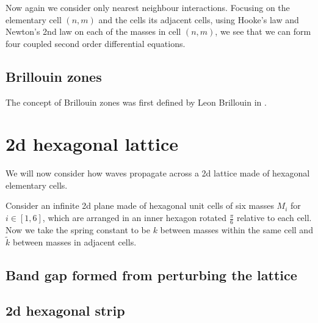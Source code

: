 Now again we consider only nearest neighbour interactions. Focusing on the
elementary cell $(n,m)$ and the cells its adjacent cells, using Hooke's law and
Newton's 2nd law on each of the masses in cell $(n,m)$, we see that we can form
four coupled second order differential equations.

\subsection{Brillouin zones}
The concept of Brillouin zones was first defined by Leon Brillouin in
\cite{brillouin}.

\section{2d hexagonal lattice}
We will now consider how waves propagate across a 2d lattice made of hexagonal elementary cells. 

Consider an infinite 2d plane made of hexagonal unit cells of six masses $M_i$
for $i\in\left[1,6\right]$, which are arranged in an inner hexagon rotated
$\frac{\pi}{6}$ relative to each cell. Now we take the spring constant to be $k$
between masses within the same cell and $\tilde{k}$ between masses in adjacent
cells.

\subsection{Band gap formed from perturbing the lattice}

\subsection{2d hexagonal strip}
